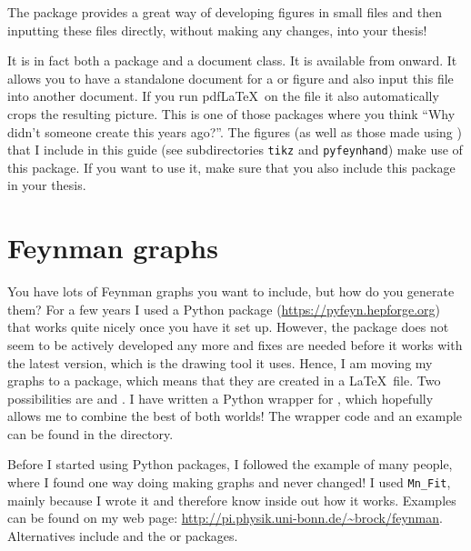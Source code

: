 The  package provides a great way of developing
figures in small files and then inputting these files directly,
without making any changes, into your thesis!

It is in fact both a package and a document class. It is
available from  onward. It allows you to have a
standalone document for a  or  figure
and also input this file into another document. If you run pdf\LaTeX\
on the file it also automatically crops the resulting picture. This is
one of those packages where you think
\enquote{Why didn't someone create this years ago?}.
The \TikZ figures (as well as those made using )
that I include in this guide (see subdirectories \texttt{tikz} and \texttt{pyfeynhand})
make use of this package.
If you want to use it, make sure that you also include this package in
your thesis.


\section{Feynman graphs}%
\label{sec:fig:feynman}

You have lots of Feynman graphs you want to include, but how do you
generate them? 
For a few years I used a Python package  (\url{https://pyfeyn.hepforge.org})
that works quite nicely once you have it set up.
However, the package does not seem to be actively developed any more
and fixes are needed before it works with the latest \Package{PyX} version,
which is the drawing tool it uses.
Hence, I am moving my graphs to a \TikZ package, which means that they are created in a \LaTeX\ file.
Two possibilities are \Package{TikZ-Feynman} and .
I have written a Python wrapper for \Package{TikZ-FeynHand},
which hopefully allows me to combine the best of both worlds!
The wrapper code and an example can be found in the  directory.

Before I started using Python packages, I followed the example of many people,
where I found one way doing making graphs and never changed!
I used \texttt{Mn\_Fit},
mainly because I wrote it and therefore know inside out how it works.
Examples can be found on my web page:
\url{http://pi.physik.uni-bonn.de/~brock/feynman}.
Alternatives include  and the  or
\Package{feynmp} packages.


